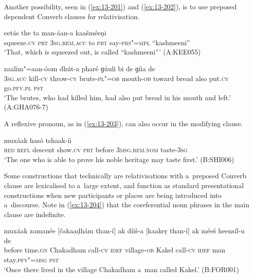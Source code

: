Another possibility, seen in (\ref{ex:13-201}) and (\ref{ex:13-202}), is to use preposed dependent Converb clauses for relativisation.

\begin{exe}
\ex
\label{ex:13-201}
\gll [preeṣaá ba] eetás the ta man-áan-a  kaašméeṇi \\
squeeze.\textsc{cv} \textsc{prt} \textsc{3sg.rem.acc} to \textsc{prt} say-\textsc{prs"=mpl}  ``kashmeeni'' \\
\glt `That, which is squeezed out, is called ``kashmeeni''' (A:KEE055)

\ex
\label{ex:13-202}
 zaalim"=aan-óom dhút-a  pharé ɡúuli bi de ɡíia de \\
\textsc{3sg.acc} kill-\textsc{cv} throw-\textsc{cv} brute-\textsc{pl"=ob} mouth-\textsc{ob}  toward bread also put.\textsc{cv} go.\textsc{pfv.pl} \textsc{pst} \\
\glt `The brutes, who had killed him, had also put bread in his mouth and left.' (A:GHA076-7) 
\end{exe}

A reflexive pronoun, as in (\ref{ex:13-203}), can also occur in the modifying clause. 

\begin{exe}
\ex
\label{ex:13-203}
 muxáak hasó  tshaak-íi \\
\textsc{red} \textsc{refl} descent show.\textsc{cv} \textsc{prt} before \textsc{3msg.rem.nom}  taste-\textsc{3sg} \\
\glt `The one who is able to prove his noble heritage may taste first.' (B:SHI006) 
\end{exe}

Some constructions that technically are relativisations with a~preposed Converb clause are lexicalised to a~large extent, and function as standard presentational constructions when new participants or places are being introduced into a~discourse. Note in (\ref{ex:13-204}) that the coreferential noun phrases in the main clause are indefinite.

\begin{exe}
\ex
\label{ex:13-204}
\gll muxáak zamanée [čakaaḍhám than-í] ak díiš-a  [kaakeṛ than-í] ak méeš heensíl-u de  \\
before time.\textsc{gn} Chakadham call-\textsc{cv} \textsc{idef} village-\textsc{ob}  Kakel call-\textsc{cv} \textsc{idef} man stay.\textsc{pfv"=msg} \textsc{pst} \\
\glt `Once there lived in the village Chakadham a~man called Kakel.' (B:FOR001)
\end{exe}

